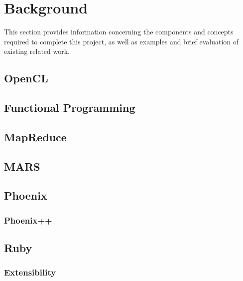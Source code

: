 \section{Background}
This section provides information concerning the components and concepts required to complete this project, as well as examples and brief evaluation of existing related work.
\subsection{OpenCL}
\subsection{Functional Programming}
\subsection{MapReduce}
\subsection{MARS}
\subsection{Phoenix}
\subsubsection{Phoenix++}
\subsection{Ruby}
\subsubsection{Extensibility}
